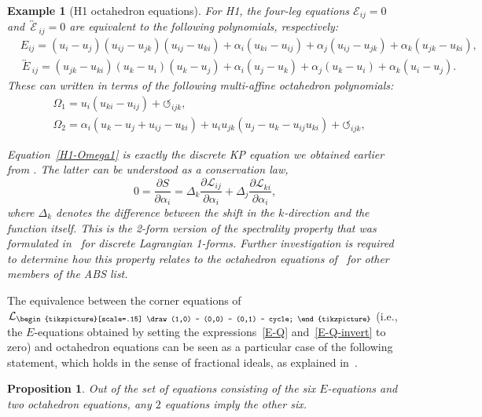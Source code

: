 \documentclass[10pt,a4paper]{amsart}
\newcommand{\inversion}[1]{\!\overleftrightarrow{\,#1\,}\!}
\newcommand{\triang}{{\begin{tikzpicture}[scale=.15]
			\draw (1,0) -- (0,0) -- (0,1) -- cycle;
\end{tikzpicture}}}
\newcommand{\cyclic}{{\circlearrowleft}_{ijk}}
\newcommand{\pdv}[2]{\frac{\partial {#1}}{\partial {#2}}}
\newcommand{\cL}{\mathcal{L}}
\newtheorem{Example}[Definition]{Example}
\newtheorem{Proposition}[Definition]{Proposition}
\numberwithin{equation}{section}
\begin{document}
\begin{Example}[H1 octahedron equations]
 For H1, the four-leg equations $\mathcal{E}_{ij} = 0$ and $\inversion{\mathcal{E}}_{ij} = 0$ are equivalent to the following polynomials, respectively:
 \begin{align*}
 &E_{ij} = (u_i - u_j) (u_{ij} - u_{jk}) (u_{ij} - u_{ki} ) + \alpha_i (u_{ki} - u_{ij} ) + \alpha_j (u_{ij} - u_{jk} ) + \alpha_k ( u_{jk} - u_{ki} ) , \\
 &\inversion{E}_{ij} = (u_{jk} - u_{ki} ) (u_k - u_i) (u_k - u_j) + \alpha_i ( u_j - u_k ) + \alpha_j (u_k - u_i ) + \alpha_k ( u_i - u_j ) .
 \end{align*}
 These can written in terms of the following multi-affine octahedron polynomials:
 \begin{align}
 &\Omega_1= u_i ( u_{ki} - u_{ij} ) + \cyclic , \label{H1-Omega1} \\
 &\Omega_2 = \alpha_i ( u_k - u_j + u_{ij} - u_{ki} ) + u_i u_{jk} ( u_j - u_k - u_{ij} u_{ki} ) + \cyclic ,\nonumber
 \end{align}

 Equation~\eqref{H1-Omega1} is exactly the discrete KP equation we obtained earlier from \smash{$\pdv{S_\triang}{\alpha_i} = 0$}. The latter can be understood as a conservation law,
 \[ 0 = \pdv{S}{\alpha_i} = \Delta_k \pdv{\cL_{ij}}{\alpha_i} + \Delta_j \pdv{\cL_{ki}}{\alpha_i} , \]
 where $\Delta_k$ denotes the difference between the shift in the $k$-direction and the function itself.
 This is the 2-form version of the \emph{spectrality property} that was formulated in~\cite{suris2013variational} for discrete Lagrangian 1-forms.
 Further investigation is required to determine how this property relates to the octahedron equations of~\cite{boll2016integrability} for other members of the ABS list.
\end{Example}

The equivalence between the corner equations of $\cL_\triang$ (i.e., the $E$-equations obtained by setting the expressions~\eqref{E-Q} and~\eqref{E-Q-invert} to zero) and octahedron equations
can be seen as a particular case of the following statement, which holds in the sense of fractional ideals, as explained in~\cite{boll2016integrability}.

\begin{Proposition}
\label{prop-2outof8}
 Out of the set of equations consisting of the six $E$-equations and two octahedron equations, any $2$ equations imply the other six.
\end{Proposition}
\end{document}
